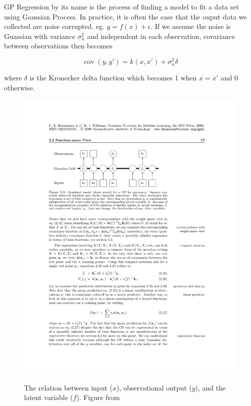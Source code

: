 \documentclass[14pt]{report}
\numberwithin{equation}{chapter}
\begin{document}
\begin{spacing}{2}
GP Regression by its name is the process of finding a model to fit a data set using Gaussian Process. In practice, it is often the case that the ouput data we collected are noise corrupted. eg. $y = f(x)+ \epsilon$. If we assume the noise is Guassian with variance $\sigma_n^2$ and independent in each observation, covariance between observations then becomes

\begin{equation}
\label{cov_y}
\operatorname{cov}(y,y\prime) = k(x,x\prime) + \sigma_n^2\delta
\end{equation}

where $\delta$ is the Kronecker delta function which becomes 1 when $x = x\prime$ and 0 otherwise.

\begin{figure}[h]
\centering
\includegraphics{Regression_model.pdf}
\label{regression_model}
\caption{The relation between input ($x$), observational output ($y$), and the latent variable ($f$). \newline Figure from \cite{RW}}
\end{figure}



\end{spacing}
\end{document}

